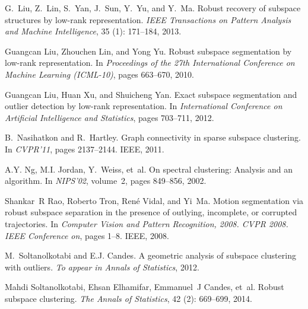\documentclass{ctexart}
\begin{document}
\begin{thebibliography}{47}
    G.~Liu, Z.~Lin, S.~Yan, J.~Sun, Y.~Yu, and Y.~Ma.
    \newblock Robust recovery of subspace structures by low-rank representation.
    \newblock \emph{IEEE Transactions on Pattern Analysis and Machine
    Intelligence}, 35 (1): 171--184, 2013.

    Guangcan Liu, Zhouchen Lin, and Yong Yu.
    \newblock Robust subspace segmentation by low-rank representation.
    \newblock In \emph{Proceedings of the 27th International Conference on Machine
    Learning (ICML-10)}, pages 663--670, 2010.

    Guangcan Liu, Huan Xu, and Shuicheng Yan.
    \newblock Exact subspace segmentation and outlier detection by low-rank
    representation.
    \newblock In \emph{International Conference on Artificial Intelligence and
    Statistics}, pages 703--711, 2012.

    B.~Nasihatkon and R.~Hartley.
    \newblock Graph connectivity in sparse subspace clustering.
    \newblock In \emph{CVPR'11}, pages 2137--2144. IEEE, 2011.

    A.Y. Ng, M.I. Jordan, Y.~Weiss, et~al.
    \newblock On spectral clustering: Analysis and an algorithm.
    \newblock In \emph{NIPS'02}, volume~2, pages 849--856, 2002.

    Shankar~R Rao, Roberto Tron, Ren{\'e} Vidal, and Yi~Ma.
    \newblock Motion segmentation via robust subspace separation in the presence of
    outlying, incomplete, or corrupted trajectories.
    \newblock In \emph{Computer Vision and Pattern Recognition, 2008. CVPR 2008.
    IEEE Conference on}, pages 1--8. IEEE, 2008.

    M.~Soltanolkotabi and E.J. Candes.
    \newblock A geometric analysis of subspace clustering with outliers.
    \newblock \emph{To appear in Annals of Statistics}, 2012.

    Mahdi Soltanolkotabi, Ehsan Elhamifar, Emmanuel~J Candes, et~al.
    \newblock Robust subspace clustering.
    \newblock \emph{The Annals of Statistics}, 42 (2): 669--699,
    2014.


\end{thebibliography}
\end{document}
